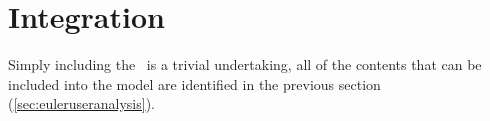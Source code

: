 %
%
% 
%

 \section{Integration}
Simply including the \EulerDesc\ is a trivial undertaking, all of the contents that can be included into the model are identified in the previous section (\ref{sec:euleruseranalysis}).